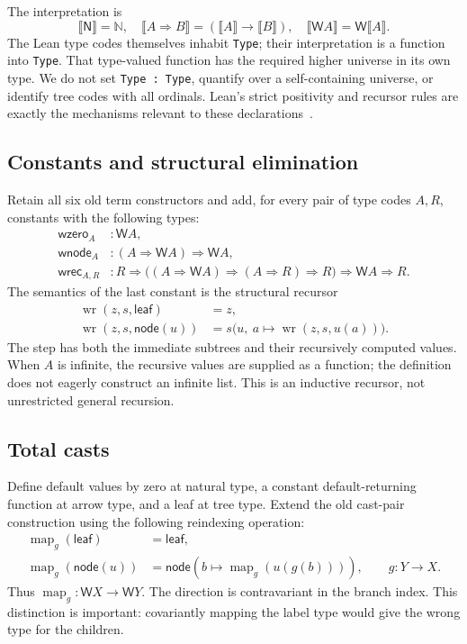 \documentclass[11pt]{article}
\theoremstyle{definition}
\newcommand{\N}{\mathbb N}
\newcommand{\W}{\mathsf W}
\begin{document}
The interpretation is
\[
 \llbracket\mathsf N\rrbracket=\N,\quad
 \llbracket A\Rightarrow B\rrbracket=
       (\llbracket A\rrbracket\to\llbracket B\rrbracket),\quad
 \llbracket\W A\rrbracket=\W\llbracket A\rrbracket.
\]
The Lean type codes themselves inhabit \texttt{Type}; their interpretation is a
function into \texttt{Type}. That type-valued function has the required higher
universe in its own type. We do not set \texttt{Type : Type}, quantify over a
self-containing universe, or identify tree codes with all ordinals. Lean's
strict positivity and recursor rules are exactly the mechanisms relevant to
these declarations~\cite{leanind,leanrec}.

\subsection{Constants and structural elimination}
Retain all six old term constructors and add, for every pair of type codes
$A,R$, constants with the following types:
\begin{align*}
 \mathsf{wzero}_A&:\W A,\\
 \mathsf{wnode}_A&:(A\Rightarrow\W A)\Rightarrow\W A,\\
 \mathsf{wrec}_{A,R}&:R\Rightarrow
  \bigl((A\Rightarrow\W A)\Rightarrow(A\Rightarrow R)\Rightarrow R\bigr)
        \Rightarrow\W A\Rightarrow R.
\end{align*}
The semantics of the last constant is the structural recursor
\begin{align*}
 \operatorname{wr}(z,s,\mathsf{leaf})&=z,\\
 \operatorname{wr}(z,s,\mathsf{node}(u))&=
      s\bigl(u,\ a\mapsto\operatorname{wr}(z,s,u(a))\bigr).
\end{align*}
The step has both the immediate subtrees and their recursively computed values.
When $A$ is infinite, the recursive values are supplied as a function; the
definition does not eagerly construct an infinite list. This is an inductive
recursor, not unrestricted general recursion.

\subsection{Total casts}
Define default values by zero at natural type, a constant default-returning
function at arrow type, and a leaf at tree type. Extend the old cast-pair
construction using the following reindexing operation:
\begin{align*}
 \operatorname{map}_g(\mathsf{leaf})&=\mathsf{leaf},\\
 \operatorname{map}_g(\mathsf{node}(u))&=
  \mathsf{node}(b\mapsto\operatorname{map}_g(u(g(b)))),
       \qquad g:Y\to X.
\end{align*}
Thus $\operatorname{map}_g:\W X\to\W Y$. The direction is contravariant in the
branch index. This distinction is important: covariantly mapping the label type
would give the wrong type for the children.
\end{document}
